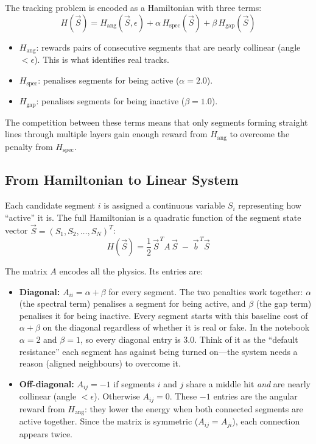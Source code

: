 \documentclass[11pt, a4paper]{article}
\begin{document}
The tracking problem is encoded as a Hamiltonian with three terms:
\begin{equation}
    H(\vec{S}) = H_{\text{ang}}(\vec{S}, \epsilon) + \alpha\, H_{\text{spec}}(\vec{S}) + \beta\, H_{\text{gap}}(\vec{S})
\end{equation}

\begin{itemize}
    \item $H_{\text{ang}}$: rewards pairs of consecutive segments that are
          nearly collinear (angle $< \epsilon$). This is what identifies
          real tracks.
    \item $H_{\text{spec}}$: penalises segments for being active
          ($\alpha = 2.0$).
    \item $H_{\text{gap}}$: penalises segments for being inactive
          ($\beta = 1.0$).
\end{itemize}

The competition between these terms means that only segments forming
straight lines through multiple layers gain enough reward from
$H_{\text{ang}}$ to overcome the penalty from $H_{\text{spec}}$.

\subsection{From Hamiltonian to Linear System}

Each candidate segment $i$ is assigned a continuous variable $S_i$
representing how ``active'' it is. The full Hamiltonian is a quadratic
function of the segment state vector $\vec{S} = (S_1, S_2, \ldots,
S_N)^T$:
\begin{equation}
    H(\vec{S}) = \frac{1}{2}\,\vec{S}^{\,T} A\, \vec{S} \;-\; \vec{b}^{\,T}\vec{S}
\end{equation}

The matrix $A$ encodes all the physics. Its entries are:
\begin{itemize}
    \item \textbf{Diagonal:} $A_{ii} = \alpha + \beta$ for every segment.
          The two penalties work together: $\alpha$ (the spectral term)
          penalises a segment for being active, and $\beta$ (the gap term)
          penalises it for being inactive. Every segment starts with this
          baseline cost of $\alpha + \beta$ on the diagonal regardless of
          whether it is real or fake. In the notebook $\alpha = 2$ and
          $\beta = 1$, so every diagonal entry is $3.0$. Think of it as the
          ``default resistance'' each segment has against being turned on---the
          system needs a reason (aligned neighbours) to overcome it.
    \item \textbf{Off-diagonal:} $A_{ij} = -1$ if segments $i$ and $j$
          share a middle hit \emph{and} are nearly collinear (angle $<
          \epsilon$). Otherwise $A_{ij} = 0$. These $-1$ entries are the
          angular reward from $H_{\text{ang}}$: they lower the energy when
          both connected segments are active together. Since the matrix is
          symmetric ($A_{ij} = A_{ji}$), each connection appears twice.
\end{itemize}
\end{document}

